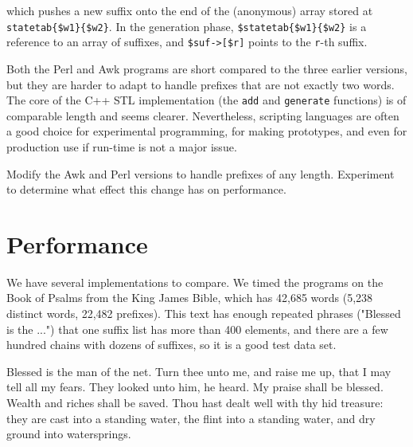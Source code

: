 which pushes a new suffix onto the end of the (anonymous) array stored at
\verb'statetab{$w1}{$w2}'. In the generation phase,
\verb'$statetab{$w1}{$w2}' is a reference to an array of suffixes, and
\verb'$suf->[$r]' points to the \verb'r'-th suffix.

Both the Perl and Awk programs are short compared to the three earlier
versions, but they are harder to adapt to handle prefixes that are not
exactly two words. The core of the C++ STL implementation (the \verb'add'
and \verb'generate' functions) is of comparable length and seems clearer.
Nevertheless, scripting languages are often a good choice for experimental
programming, for making prototypes, and even for production use if run-time
is not a major issue.

\begin{exercise}
    Modify the Awk and Perl versions to handle prefixes of any length.
    Experiment to determine what effect this change has on performance.
\end{exercise}

\section{Performance}
\label{sec:performance}

We have several implementations to compare. We timed the programs on the
Book of Psalms from the King James Bible, which has 42,685 words (5,238
distinct words, 22,482 prefixes). This text has enough repeated phrases
("Blessed is the ...") that one suffix list has more than 400 elements, and
there are a few hundred chains with dozens of suffixes, so it is a good
test data set.
\begin{oldquote}
    Blessed is the man of the net. Turn thee unto me, and raise me up, that
    I may tell all my fears. They looked unto him, he heard. My praise
    shall be blessed. Wealth and riches shall be saved. Thou hast dealt
    well with thy hid treasure: they are cast into a standing water, the
    flint into a standing water, and dry ground into watersprings.
\end{oldquote}

